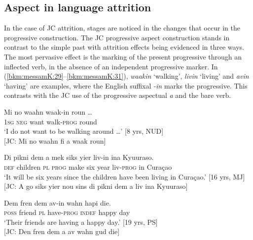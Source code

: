 \documentclass[output=paper,colorlinks,citecolor=brown]{langscibook}
\begin{document}
\subsection{Aspect in language attrition} \label{sec:messamk:5.3}
In the case of JC attrition, stages are noticed in the changes that occur in the progressive construction. The JC progressive aspect construction stands in contrast to the simple past with attrition effects being evidenced in three ways. The most pervasive effect is the marking of the present progressive through an inflected verb, in the absence of an independent progressive marker. In (\ref{bkm:messamK:29}--\ref{bkm:messamK:31}), \textit{waakin} ‘walking’, \textit{livin} ‘living’ and \textit{avin} ‘having’ are examples, where the English suffixal \textit{-in} marks the progressive. This contrasts with the JC use of the progressive aspectual \textit{a} and the bare verb.


\ea \label{bkm:messamK:29}
\gll  Mi   no    waahn  waak-in        roun …\\
1\textsc{sg} \textsc{neg} want    walk-\textsc{prog} round\\
\glt `I do not want to be walking around …’                 [8 yrs, NUD] \\{}
[JC: Mi no  waahn fi a waak roun]
\z


\ea \label{bkm:messamK:30}
\gll  Di    pikni      dem a        mek   siks yier  liv-in      ina Kyuuraso.\\
\textsc{def} children \textsc{pl}     \textsc{prog} make six  year liv-\textsc{prog} in   Curaçao\\
\glt `It will be six years since the children have been living in Curaçao.’     [16 yrs, MJ]\\{}
[JC: A go siks yier nou sins di pikni dem a liv ina Kyuuraso]
\z



\ea \label{bkm:messamK:31}
\gll  Dem  fren    dem av-in       wahn   hapi    die.\\
\textsc{poss} friend  \textsc{pl}   have-\textsc{prog}  \textsc{indef}  happy day\\
\glt `Their friends are having a happy day.’                   [19 yrs, PS]\\{}
[JC: Den fren dem a av wahn gud die]
\z
\end{document}
